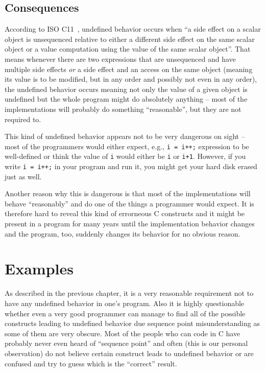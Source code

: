 \section{Consequences}%
According to ISO C11~\cite{WG14N1570}, undefined behavior occurs when ``a side effect on a scalar object is unsequenced relative to either a different side effect on the same scalar object or a value computation using the value of the same scalar object''. That means whenever there are two expressions that are unsequenced and have multiple side effects \emph{or} a side effect and an access on the same object (meaning its value is to be modified, but in any order and possibly not even in any order), the undefined behavior occurs meaning not only the value of a given object is undefined but the whole program might do absolutely anything -- most of the implementations will probably do something ``reasonable'', but they are not required to.

This kind of undefined behavior appears not to be very dangerous on sight -- most of the programmers would either expect, e.g., \verb|i = i++;| expression to be well-defined or think the value of \verb|i| would either be \verb|i| or \verb|i+1|.
However, if you write \verb|i = i++;| in your program and run it, you might get your hard disk erased just as well.

Another reason why this is dangerous is that most of the implementations will behave ``reasonably'' and do one of the things a programmer would expect. It is therefore hard to reveal this kind of errorneous C constructs and it might be present in a program for many years until the implementation behavior changes and the program, too, suddenly changes its behavior for no obvious reason.

\chapter{Examples}
As described in the previous chapter, it is a very reasonable requirement not to have any undefined behavior in one's program. Also it is highly questionable whether even a very good programmer can manage to find all of the possible constructs leading to undefined behavior due sequence point misunderstanding as some of them are very obscure. Most of the people who can code in C have probably never even heard of ``sequence point'' and often (this is our personal observation) do not believe certain construct leads to undefined behavior or are confused and try to guess which is the ``correct'' result.

